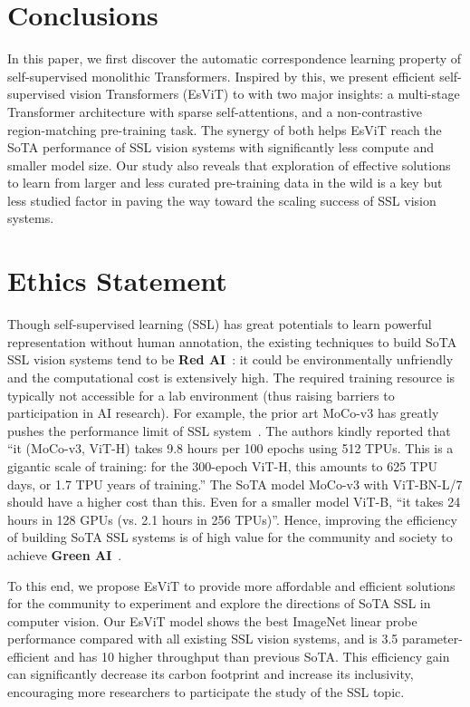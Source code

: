 \documentclass{article} \usepackage{iclr2022_conference,times}
\newcommand{\shortname}{EsViT}
\begin{document}
\vspace{-3mm}
\section{Conclusions}
\vspace{-3mm}
In this paper, we first discover the automatic correspondence learning property of self-supervised monolithic Transformers. Inspired by this, we present efficient self-supervised vision Transformers (\shortname{}) to with two major insights: a multi-stage Transformer architecture with sparse self-attentions, and a non-contrastive region-matching pre-training task. The synergy of both helps \shortname{} reach the SoTA performance of SSL vision systems with significantly less compute and smaller model size. 
Our study also reveals that exploration of effective solutions to learn from larger and less curated pre-training data in the wild is a key but less studied factor in paving the way toward the scaling success of SSL vision systems.




\section*{Ethics Statement}
Though self-supervised learning (SSL) has great potentials to learn powerful representation without human annotation, the existing techniques to build SoTA SSL vision systems tend to be {\bf\textcolor{red!100}{Red AI}}~\citep{schwartz2020green}: it could be environmentally unfriendly and the computational cost is extensively high. The required training resource is typically not accessible for a lab environment (thus raising barriers to participation in AI research). For example, the prior art MoCo-v3 has greatly pushes the performance limit of SSL system~\citep{chen2021empirical}. The authors kindly reported that ``it (MoCo-v3, ViT-H) takes 9.8 hours per 100 epochs using 512 TPUs. This is a gigantic scale of training: for the 300-epoch ViT-H, this amounts to 625 TPU days, or 1.7 TPU years of training.'' The SoTA model MoCo-v3 with ViT-BN-L/7 should have a higher cost than this. Even for a smaller model ViT-B, ``it takes 24 hours in 128 GPUs (vs. 2.1 hours in 256 TPUs)''. Hence, improving the efficiency of building SoTA SSL systems is of high value for the community and society to achieve {\bf\textcolor{emerald!100}{Green AI}}~\citep{schwartz2020green}.

To this end, we propose \shortname{} to provide more affordable and efficient solutions for the community to experiment and explore the directions of SoTA SSL in computer vision. Our EsViT model shows the best ImageNet linear probe performance compared with all existing SSL vision systems, and is 3.5 parameter-efficient and has 10 higher throughput than previous SoTA. This efficiency gain can significantly decrease its carbon footprint and increase its inclusivity, encouraging more researchers to participate the study of the SSL topic. 
\end{document}
